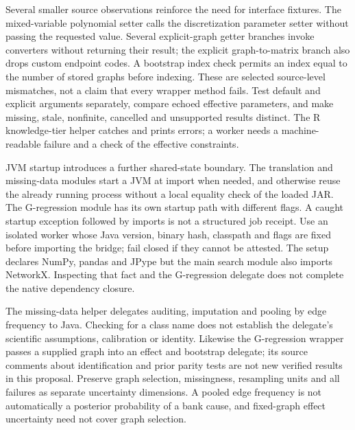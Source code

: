 Several smaller source observations reinforce the need for interface fixtures.
The mixed-variable polynomial setter calls the discretization parameter setter
without passing the requested value. Several explicit-graph getter branches
invoke converters without returning their result; the explicit graph-to-matrix
branch also drops custom endpoint codes. A bootstrap index check permits an
index equal to the number of stored graphs before indexing. These are selected
source-level mismatches, not a claim that every wrapper method fails. Test
default and explicit arguments separately, compare echoed effective parameters,
and make missing, stale, nonfinite, cancelled and unsupported results distinct.
The R knowledge-tier helper catches and prints errors; a worker needs a
machine-readable failure and a check of the effective constraints.
\citep{exec24_pytetrad_source}

JVM startup introduces a further shared-state boundary. The translation and
missing-data modules start a JVM at import when needed, and otherwise reuse
the already running process without a local equality check of the loaded JAR.
The G-regression module has its own startup path with different flags. A caught
startup exception followed by imports is not a structured job receipt. Use an
isolated worker whose Java version, binary hash, classpath and flags are fixed
before importing the bridge; fail closed if they cannot be attested. The setup
declares NumPy, pandas and JPype but the main search module also imports
NetworkX. Inspecting that fact and the G-regression delegate does not complete
the native dependency closure.~\citep{exec24_pytetrad_source}

The missing-data helper delegates auditing, imputation and pooling by edge
frequency to Java. Checking for a class name does not establish the delegate's
scientific assumptions, calibration or identity. Likewise the G-regression
wrapper passes a supplied graph into an effect and bootstrap delegate; its
source comments about identification and prior parity tests are not new
verified results in this proposal. Preserve graph selection, missingness,
resampling units and all failures as separate uncertainty dimensions. A pooled
edge frequency is not automatically a posterior probability of a bank cause,
and fixed-graph effect uncertainty need not cover graph selection.
\citep{exec24_pytetrad_source}

